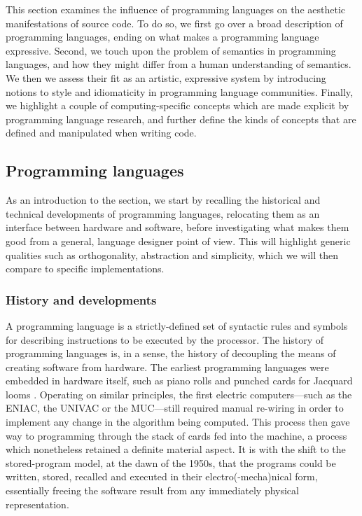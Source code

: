 This section examines the influence of programming languages on the aesthetic manifestations of source code. To do so, we first go over a broad description of programming languages, ending on what makes a programming language expressive. Second, we touch upon the problem of semantics in programming languages, and how they might differ from a human understanding of semantics. We then we assess their fit as an artistic, expressive system by introducing notions to style and idiomaticity in programming language communities. Finally, we highlight a couple of computing-specific concepts which are made explicit by programming language research, and further define the kinds of concepts that are defined and manipulated when writing code.

\subsection{Programming languages}
\label{subsec:programming-languages}

As an introduction to the section, we start by recalling the historical and technical developments of programming languages, relocating them as an interface between hardware and software, before investigating what makes them good from a general, language designer point of view. This will highlight generic qualities such as orthogonality, abstraction and simplicity, which we will then compare to specific implementations.

\subsubsection{History and developments}
\label{subsubsec:history-developments}

A programming language is a strictly-defined set of syntactic rules and symbols for describing instructions to be executed by the processor. The history of programming languages is, in a sense, the history of decoupling the means of creating software from hardware. The earliest programming languages were embedded in hardware itself, such as piano rolls and punched cards for Jacquard looms \citep{sack_software_2019}. Operating on similar principles, the first electric computers—such as the ENIAC, the UNIVAC or the MUC—still required manual re-wiring in order to implement any change in the algorithm being computed. This process then gave way to programming through the stack of cards fed into the machine, a process which nonetheless retained a definite material aspect. It is with the shift to the stored-program model, at the dawn of the 1950s, that the programs could be written, stored, recalled and executed in their electro(-mecha)nical form, essentially freeing the software result from any immediately physical representation.

